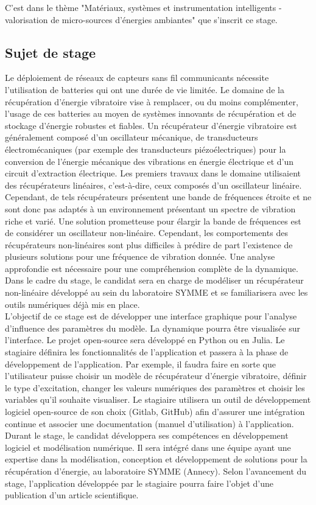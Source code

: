 \documentclass[a4paper, french, 12pt, titlepage]{article}
\begin{document}
C'est dans le thème "Matériaux, systèmes et instrumentation intelligents - valorisation de micro-sources d'énergies ambiantes" que s'inscrit ce stage.

\subsection{Sujet de stage}

Le déploiement de réseaux de capteurs sans fil communicants nécessite l'utilisation de batteries qui ont une durée de vie limitée.
Le domaine de la récupération d'énergie vibratoire vise à remplacer, ou du moins complémenter, l'usage de ces batteries au moyen de systèmes innovants de récupération et de stockage d'énergie robustes et fiables.
Un récupérateur d'énergie vibratoire est généralement composé d'un oscillateur mécanique, de transducteurs électromécaniques (par exemple des transducteurs piézoélectriques) pour la conversion de l'énergie mécanique des vibrations en énergie électrique et d'un circuit d'extraction électrique.
Les premiers travaux dans le domaine utilisaient des récupérateurs linéaires, c'est-à-dire, ceux composés d'un oscillateur linéaire.
Cependant, de tels récupérateurs présentent une bande de fréquences étroite et ne sont donc pas adaptés à un environnement présentant un spectre de vibration riche et varié.
Une solution prometteuse pour élargir la bande de fréquences est de considérer un oscillateur non-linéaire.
Cependant, les comportements des récupérateurs non-linéaires sont plus difficiles à prédire de part l'existence de plusieurs solutions pour une fréquence de vibration donnée.
Une analyse approfondie est nécessaire pour une compréhension complète de la dynamique.
Dans le cadre du stage, le candidat sera en charge de modéliser un récupérateur non-linéaire développé au sein du laboratoire SYMME et se familiarisera avec les outils numériques déjà mis en place.\\

L'objectif de ce stage est de développer une interface graphique pour l'analyse d'influence des paramètres du modèle.
La dynamique pourra être visualisée sur l'interface.
Le projet open-source sera développé en Python ou en Julia.
Le stagiaire définira les fonctionnalités de l'application et passera à la phase de développement de l'application.
Par exemple, il faudra faire en sorte que l'utilisateur puisse choisir un modèle de récupérateur d'énergie vibratoire, définir le type d'excitation, changer les valeurs numériques des paramètres et choisir les variables qu'il souhaite visualiser.
Le stagiaire utilisera un outil de développement logiciel open-source de son choix (Gitlab, GitHub) afin d'assurer une intégration continue et associer une documentation (manuel d'utilisation) à l'application.
Durant le stage, le candidat développera ses compétences en développement logiciel et modélisation numérique.
Il sera intégré dans une équipe ayant une expertise dans la modélisation, conception et développement de solutions pour la récupération d'énergie, au laboratoire SYMME (Annecy).
Selon l'avancement du stage, l'application développée par le stagiaire pourra faire l'objet d'une publication d'un article scientifique.
\end{document}
